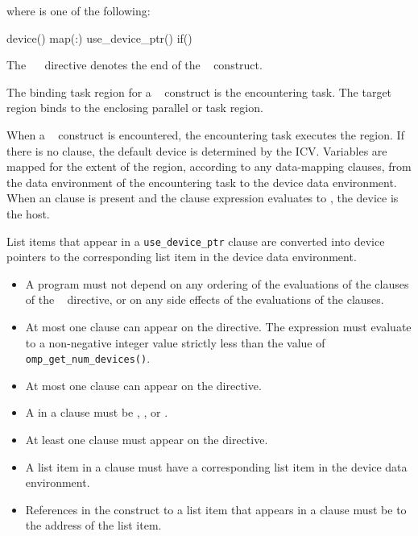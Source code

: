 where  is one of the following:

\begin{indentedcodelist}
device()
map(\plc{[[map-type-modifier[,]] map-type}:\plc{ ] list})
use\_device\_ptr()
if()
\end{indentedcodelist}

The ~~ directive denotes the end of the ~ construct.
\fortranspecificend

\binding
The binding task region for a ~ construct is the encountering task. The 
target region binds to the enclosing parallel or task region.

\descr
When a ~ construct is encountered, the encountering task executes the region. If there is no  clause, the default device is determined by the  ICV. Variables are mapped for the extent of the region, according to any data-mapping clauses, from the data environment of the encountering task to the device data environment. When an  clause is present and the  clause expression evaluates to , the device is the host.

List items that appear in a \verb#use_device_ptr# clause are converted into
device pointers to the corresponding list item in the device data environment.

\restrictions
\begin{itemize}
  \item A program must not depend on any ordering of the evaluations of the clauses of the
    ~ directive, or on any side effects of the evaluations of the clauses.

  \item At most one  clause can appear on the directive. The  expression
    must evaluate to a non-negative integer value strictly less than the value
    of \verb#omp_get_num_devices()#.

  \item At most one  clause can appear on the directive.
  \item A  in a  clause must be , ,  or .
  \item At least one  clause must appear on the directive.


  \item A list item in a  clause must have a
    corresponding list item in the device data environment.

  \item References in the construct to a list item that appears in a
     clause must be to the address of the list item.
\end{itemize}

